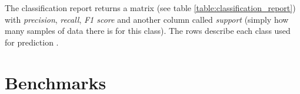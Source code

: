 The classification report returns a matrix (see table \ref{table:classification_report}) with \textit{precision}, 
\textit{recall}, \textit{F1 score} and another column called \textit{support} (simply how many samples of data there is for this class). 
The rows describe each class used for prediction \cite{sklearn_classification_report}.

\section{Benchmarks}
 